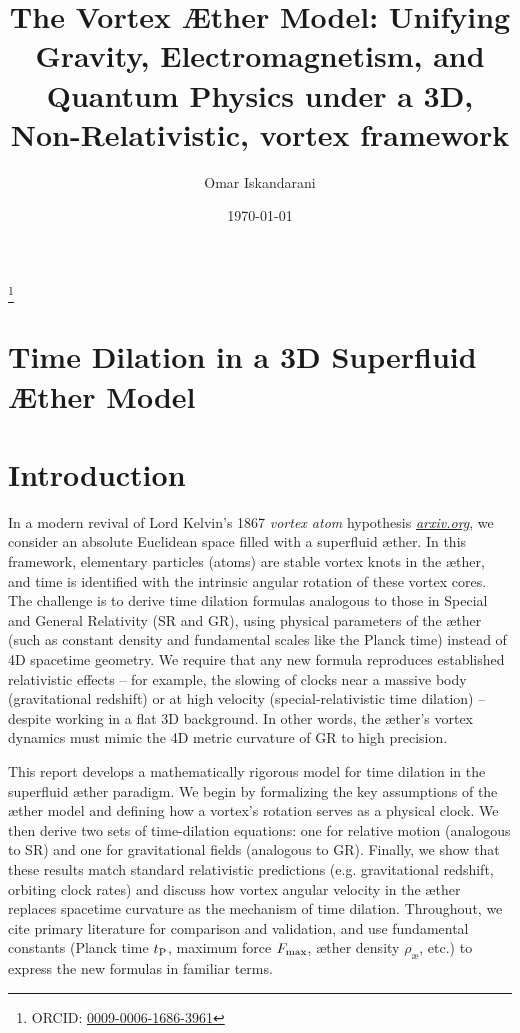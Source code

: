 \documentclass[aps,preprint,superscriptaddress]{revtex4}
\begin{document}
    \author{Omar Iskandarani}
    \title{The Vortex Æther Model: Unifying Gravity, Electromagnetism, and Quantum Physics under a 3D, Non-Relativistic, vortex framework}
    \date{\today}
    \thanks{ORCID: \href{https://orcid.org/0009-0006-1686-3961}{0009-0006-1686-3961}}




    \section*{Time Dilation in a 3D Superfluid Æther Model}

    \section*{Introduction}

    In a modern revival of Lord Kelvin’s 1867 \textit{vortex atom} hypothesis
    \href{https://arxiv.org/pdf/2012.07395#:~:text=Thomson%20,on%20the%20right%20path%20when}{\textit{arxiv.org}}, we consider an absolute Euclidean space filled with a superfluid æther. In this framework, elementary particles (atoms) are stable vortex knots in the æther, and time is identified with the intrinsic angular rotation of these vortex cores. The challenge is to derive time dilation formulas analogous to those in Special and General Relativity (SR and GR), using physical parameters of the æther (such as constant density and fundamental scales like the Planck time) instead of 4D spacetime geometry. We require that any new formula reproduces established relativistic effects – for example, the slowing of clocks near a massive body (gravitational redshift) or at high velocity (special-relativistic time dilation) – despite working in a flat 3D background. In other words, the æther’s vortex dynamics must mimic the 4D metric curvature of GR to high precision.

    This report develops a mathematically rigorous model for time dilation in the superfluid æther paradigm. We begin by formalizing the key assumptions of the æther model and defining how a vortex’s rotation serves as a physical clock. We then derive two sets of time-dilation equations: one for relative motion (analogous to SR) and one for gravitational fields (analogous to GR). Finally, we show that these results match standard relativistic predictions (e.g. gravitational redshift, orbiting clock rates) and discuss how vortex angular velocity in the æther replaces spacetime curvature as the mechanism of time dilation. Throughout, we cite primary literature for comparison and validation, and use fundamental constants (Planck time $t_{\rm P}$, maximum force $F_{\rm max}$, æther density $\rho_{\text{\ae}}$, etc.) to express the new formulas in familiar terms.
\end{document}
